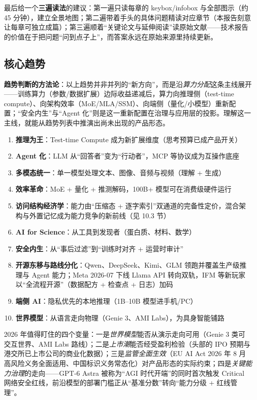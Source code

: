 \documentclass[12pt,a4paper]{article}
\begin{document}
最后给一个\textbf{三遍读法}的建议：第一遍只读每章的 keybox/infobox 与全部图示（约 45 分钟），建立全景地图；第二遍带着手头的具体问题精读对应章节（本报告刻意让每章可独立成篇）；第三遍顺着“关键论文与延伸阅读”读原始文献——技术报告的价值在于把问题“问到点子上”，而答案永远在原始来源里持续更新。

\subsection{核心趋势}

\textbf{趋势判断的方法论}：以上趋势并非并列的“新方向”，而是沿\emph{算力分配}这条主线展开——训练算力（参数/数据扩展）边际收益递减后，算力向推理侧（test-time compute）、向架构效率（MoE/MLA/SSM）、向端侧（量化/小模型）重新配置；“安全内生”与“Agent 化”则是这一重新配置在治理与应用层的投影。理解这一主线，就能从趋势列表中推演出尚未出现的产品形态。

\begin{enumerate}
  \item \textbf{推理为王}：Test-time Compute 成为新扩展维度（思考预算已成产品开关）
  \item \textbf{Agent 化}：LLM 从“回答者”变为“行动者”，MCP 等协议成为互操作底座
  \item \textbf{多模态统一}：单一模型处理文本、图像、音频与视频（理解 + 生成）
  \item \textbf{效率革命}：MoE + 量化 + 推测解码，100B+ 模型可在消费级硬件运行
  \item \textbf{访问结构经济学}：能力由“压缩态 + 逐字索引”双通道的完备性定价，混合架构与外置记忆成为能力竞争的新前线（见 10.3 节）
  \item \textbf{AI for Science}：从工具到发现者（蛋白质、材料、数学）
  \item \textbf{安全内生}：从“事后过滤”到“训练时对齐 + 运营时审计”
  \item \textbf{开源东移与路线分化}：Qwen、DeepSeek、Kimi、GLM 领跑并覆盖生产级推理与 Agent 能力；Meta 2026-07 下线 Llama API 转向双轨，IFM 等新玩家以“全流程开源”（数据配方 + 检查点 + 日志）加码
  \item \textbf{端侧 AI}：隐私优先的本地推理（1B--10B 模型进手机/PC）
  \item \textbf{世界模型}：从语言走向物理（Genie 3、AMI Labs），为具身智能铺路
\end{enumerate}

2026 年值得盯住的四个变量：一是\emph{世界模型}能否从演示走向可用（Genie 3 类可交互世界、AMI Labs 路线）；二是\emph{上市潮}能否经受盈利检验（头部的 IPO 预期与港交所已上市公司的商业化数据）；三是\emph{监管全面生效}（EU AI Act 2026 年 8 月高风险义务全面适用、中国标识义务常态化）对产品形态的实际约束；四是\emph{关键能力治理}的走向——GPT-6 Astra 被称为“AGI 时代开端”的同时首次触发 Critical 网络安全红线，前沿模型的部署门槛正从“基准分数”转向“能力分级 + 红线管理”。
\end{document}

